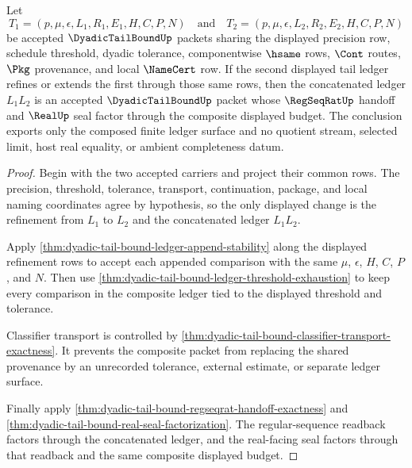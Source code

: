 \begin{theorem}
\label{thm:dyadic-tail-bound-budget-composition}
Let
$$
T_1=(p,\mu,\epsilon,L_1,R_1,E_1,H,C,P,N)
\quad\text{and}\quad
T_2=(p,\mu,\epsilon,L_2,R_2,E_2,H,C,P,N)
$$
be accepted $\DyadicTailBoundUp$ packets sharing the displayed precision row, schedule threshold, dyadic tolerance, componentwise $\hsame$ rows, $\Cont$ routes, $\Pkg$ provenance, and local $\NameCert$ row. If the second displayed tail ledger refines or extends the first through those same rows, then the concatenated ledger $L_1L_2$ is an accepted $\DyadicTailBoundUp$ packet whose $\RegSeqRatUp$ handoff and $\RealUp$ seal factor through the composite displayed budget. The conclusion exports only the composed finite ledger surface and no quotient stream, selected limit, host real equality, or ambient completeness datum.
\end{theorem}
\begin{proof}
Begin with the two accepted carriers and project their common rows. The precision, threshold, tolerance, transport, continuation, package, and local naming coordinates agree by hypothesis, so the only displayed change is the refinement from $L_1$ to $L_2$ and the concatenated ledger $L_1L_2$.

Apply \autoref{thm:dyadic-tail-bound-ledger-append-stability} along the displayed refinement rows to accept each appended comparison with the same $\mu$, $\epsilon$, $H$, $C$, $P$, and $N$. Then use \autoref{thm:dyadic-tail-bound-ledger-threshold-exhaustion} to keep every comparison in the composite ledger tied to the displayed threshold and tolerance.

Classifier transport is controlled by \autoref{thm:dyadic-tail-bound-classifier-transport-exactness}. It prevents the composite packet from replacing the shared provenance by an unrecorded tolerance, external estimate, or separate ledger surface.

Finally apply \autoref{thm:dyadic-tail-bound-regseqrat-handoff-exactness} and \autoref{thm:dyadic-tail-bound-real-seal-factorization}. The regular-sequence readback factors through the concatenated ledger, and the real-facing seal factors through that readback and the same composite displayed budget.
\end{proof}

